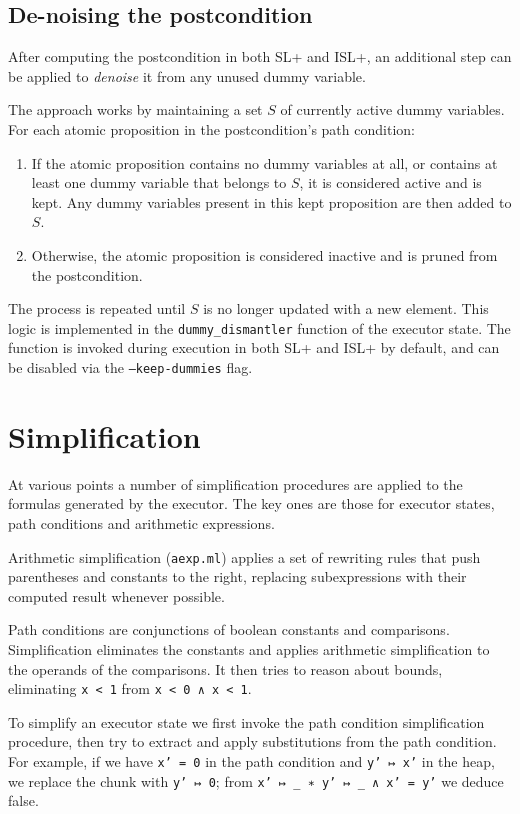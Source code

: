 \documentclass[parskip=half]{scrartcl}
\begin{document}
\subsection{De-noising the postcondition}
After computing the postcondition in both SL+ and ISL+, an additional step can be applied to \textit{denoise} it from any unused dummy variable.

The approach works by maintaining a set $S$ of currently active dummy variables. For each atomic proposition in the postcondition's path condition:
\begin{enumerate}
\item If the atomic proposition contains no dummy variables at all, or contains at least one dummy variable that belongs to $S$, it is considered active and is kept. Any dummy variables present in this kept proposition are then added to $S$.
\item Otherwise, the atomic proposition is considered inactive and is pruned from the postcondition.
\end{enumerate}
The process is repeated until $S$ is no longer updated with a new element.
This logic is implemented in the \texttt{dummy\_dismantler} function of the executor state. The function is invoked during execution in both SL+ and ISL+ by default, and can be disabled via the \texttt{--keep-dummies} flag.

\section{Simplification}

At various points a number of simplification procedures are applied to the formulas generated by the executor. The key ones are those for executor states, path conditions and arithmetic expressions.

Arithmetic simplification (\texttt{aexp.ml}) applies a set of rewriting rules that push parentheses and constants to the right, replacing subexpressions with their computed result whenever possible.

Path conditions are conjunctions of boolean constants and comparisons. Simplification eliminates the constants and applies arithmetic simplification to the operands of the comparisons. It then tries to reason about bounds, \eg eliminating \texttt{x < 1} from \texttt{x < 0 ∧ x < 1}. %

To simplify an executor state we first invoke the path condition simplification procedure, then try to extract and apply substitutions from the path condition. For example, if we have \texttt{x' = 0} in the path condition and \texttt{y' ↦ x'} in the heap, we replace the chunk with \texttt{y' ↦ 0}; from \texttt{x' ↦ \_ ∗ y' ↦ \_ ∧ x' = y'} we deduce false.
\end{document}
